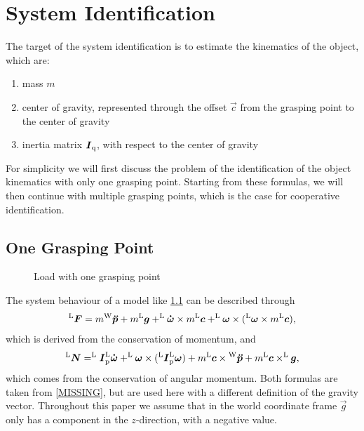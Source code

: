 

\chapter{System Identification}
\label{chap:system_identification}

The target of the system identification is to estimate the kinematics of the object, which are:
\begin{enumerate}
	\item mass $m$
	\item center of gravity, represented through the offset $\vec c$ from the grasping point to the center of gravity
	\item inertia matrix $\boldsymbol{I}_{\mathrm{q}}$, with respect to the center of gravity
\end{enumerate}

For simplicity we will first discuss the problem of the identification of the object kinematics with only one grasping point. Starting from these formulas, we will then continue with multiple grasping points, which is the case for cooperative identification.

\section{One Grasping Point}
\label{sec:one_grasping_point}

\begin{figure}
	\centering
	
	\caption{Load with one grasping point}
	\label{fig:load_one_grasping_point}
\end{figure}

The system behaviour of a model like \ref{fig:load_one_grasping_point} can be described through 
\begin{equation}
	^{\mathrm{L}}\boldsymbol{F} = m {^{\mathrm{W}}}\boldsymbol{\ddot{p}} + m ^{\mathrm{L}}\boldsymbol{g} + ^{\mathrm{L}}\boldsymbol{\dot{\omega}} \times m ^{\mathrm{L}}\boldsymbol{c} + ^{\mathrm{L}}\boldsymbol{\omega} \times (^{\mathrm{L}}\boldsymbol{\omega} \times m ^{\mathrm{L}}\boldsymbol{c}),
	\label{eq:force}
\end{equation}
which is derived from the conservation of momentum, and
\begin{equation}
	^{\mathrm{L}}\boldsymbol{N} = ^{\mathrm{L}}\boldsymbol{I}_{\mathrm{p}} ^{\mathrm{L}}\boldsymbol{\dot{\omega}} + ^{\mathrm{L}}\boldsymbol{\omega} \times (^{\mathrm{L}}\boldsymbol{I}_{\mathrm{p}} ^{\mathrm{L}}\boldsymbol{\omega}) + m ^{\mathrm{L}}\boldsymbol{c} \times {^{\mathrm{W}}}\boldsymbol{\ddot{p}} + m ^{\mathrm{L}}\boldsymbol{c} \times ^{\mathrm{L}}\boldsymbol{g},
	\label{eq:torque}
\end{equation}
which comes from the conservation of angular momentum. Both formulas are taken from \ref{MISSING}, but are used here with a different definition of the gravity vector. Throughout this paper we assume that in the world coordinate frame $\vec g$ only has a component in the $z$-direction, with a negative value.

